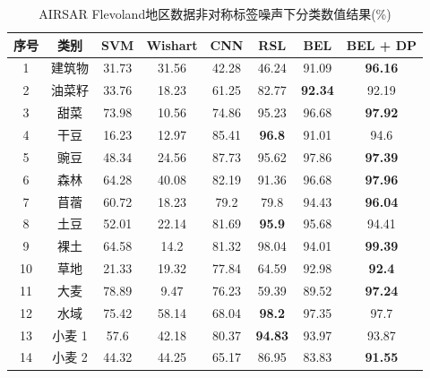 \begin{table}[ht!]
  \caption{AIRSAR Flevoland地区数据非对称标签噪声下分类数值结果(\%)}
  \label{tab:fle_res_random}
  \begin{tabular}{cccccccc}
    \toprule[1.5bp]
    序号                        & 类别    & SVM   & Wishart & CNN   & RSL            & BEL            & BEL + DP       \\
    \midrule[0.75bp]
    1                         & 建筑物   & 31.73 & 31.56   & 42.28 & 46.24          & 91.09          & \textbf{96.16} \\
    2                         & 油菜籽   & 33.76 & 18.23   & 61.25 & 82.77          & \textbf{92.34} & 92.19          \\
    3                         & 甜菜    & 73.98 & 10.56   & 74.86 & 95.23          & 96.68          & \textbf{97.92} \\
    4                         & 干豆    & 16.23 & 12.97   & 85.41 & \textbf{96.8}  & 91.01          & 94.6           \\
    5                         & 豌豆    & 48.34 & 24.56   & 87.73 & 95.62          & 97.86          & \textbf{97.39} \\
    6                         & 森林    & 64.28 & 40.08   & 82.19 & 91.36          & 96.68          & \textbf{97.96} \\
    7                         & 苜蓿    & 60.72 & 18.23   & 79.2  & 79.8           & 94.43          & \textbf{96.04} \\
    8                         & 土豆    & 52.01 & 22.14   & 81.69 & \textbf{95.9}  & 95.68          & 94.41          \\
    9                         & 裸土    & 64.58 & 14.2    & 81.32 & 98.04          & 94.01          & \textbf{99.39} \\
    10                        & 草地    & 21.33 & 19.32   & 77.84 & 64.59          & 92.98          & \textbf{92.4}  \\
    11                        & 大麦    & 78.89 & 9.47    & 76.23 & 59.39          & 89.52          & \textbf{97.24} \\
    12                        & 水域    & 75.42 & 58.14   & 68.04 & \textbf{98.2}  & 97.35          & 97.7           \\
    13                        & 小麦 1  & 57.6  & 42.18   & 80.37 & \textbf{94.83} & 93.97          & 93.87          \\
    14                        & 小麦 2  & 44.32 & 44.25   & 65.17 & 86.95          & 83.83          & \textbf{91.55} \\

\end{tabular}
\end{table}

